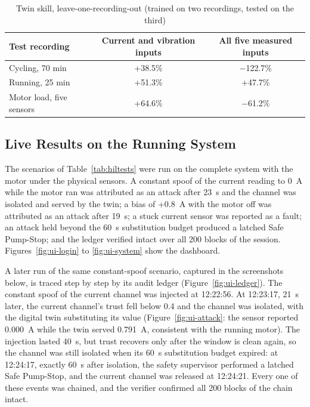 \begin{table}[htbp]
\centering
\caption{Twin skill, leave-one-recording-out (trained on two recordings, tested on the third)}
\label{tab:twinloco}
\small
\begin{tabularx}{\textwidth}{@{}X c c@{}}
\toprule
\textbf{Test recording} & \textbf{Current and vibration inputs} & \textbf{All five measured inputs} \\
\midrule
Cycling, 70 min & +38.5\% & $-$122.7\% \\
Running, 25 min & +51.3\% & +47.7\% \\
Motor load, five sensors & +64.6\% & $-$61.2\% \\
\bottomrule
\end{tabularx}
\end{table}

\subsection{Live Results on the Running System}

The scenarios of Table~\ref{tab:hiltests} were run on the complete system with the motor under the physical sensors. A constant spoof of the current reading to 0~A while the motor ran was attributed as an attack after 23~s and the channel was isolated and served by the twin; a bias of +0.8~A with the motor off was attributed as an attack after 19~s; a stuck current sensor was reported as a fault; an attack held beyond the 60~s substitution budget produced a latched Safe Pump-Stop; and the ledger verified intact over all 200 blocks of the session. Figures~\ref{fig:ui-login} to \ref{fig:ui-system} show the dashboard.

A later run of the same constant-spoof scenario, captured in the screenshots below, is traced step by step by its audit ledger (Figure~\ref{fig:ui-ledger}). The constant spoof of the current channel was injected at 12:22:56. At 12:23:17, 21~s later, the current channel's trust fell below 0.4 and the channel was isolated, with the digital twin substituting its value (Figure~\ref{fig:ui-attack}: the sensor reported 0.000~A while the twin served 0.791~A, consistent with the running motor). The injection lasted 40~s, but trust recovers only after the window is clean again, so the channel was still isolated when its 60~s substitution budget expired: at 12:24:17, exactly 60~s after isolation, the safety supervisor performed a latched Safe Pump-Stop, and the current channel was released at 12:24:21. Every one of these events was chained, and the verifier confirmed all 200 blocks of the chain intact.

